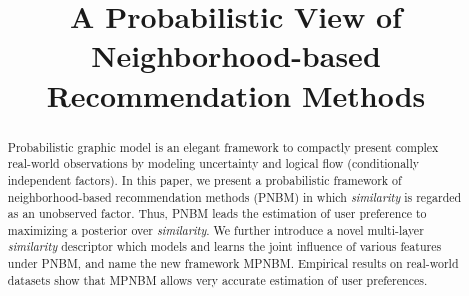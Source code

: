 \documentclass[conference]{IEEEtran}
\begin{document}
%
\title{A Probabilistic View of Neighborhood-based Recommendation Methods}


\author{
\and
{}
}


\maketitle
\begin{abstract}
Probabilistic graphic model is an elegant framework to compactly present complex real-world observations by modeling uncertainty and logical flow (conditionally independent factors). In this paper, we present a probabilistic framework of neighborhood-based recommendation methods (PNBM) in which \emph{similarity} is regarded as an unobserved factor. Thus, PNBM leads the estimation of user preference to maximizing a  posterior over \emph{similarity}. We further introduce a novel multi-layer \emph{similarity} descriptor which models and learns the joint influence of various features under PNBM, and name the new framework MPNBM. Empirical results on real-world datasets show that MPNBM allows very accurate estimation of user preferences.
\end{abstract}
\end{document}
